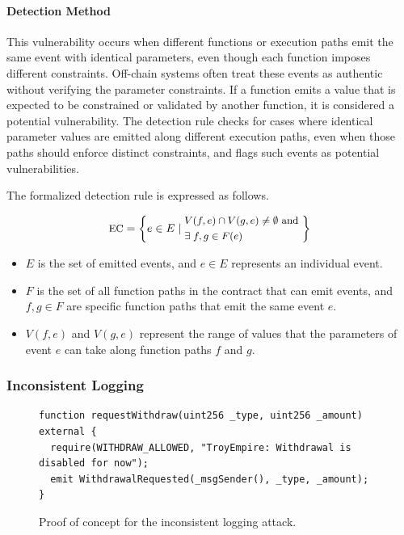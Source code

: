 \paragraph{Detection Method}
This vulnerability occurs when different functions or execution paths emit the same event with identical parameters, even though each function imposes different constraints. Off-chain systems often treat these events as authentic without verifying the parameter constraints. If a function emits a value that is expected to be constrained or validated by another function, it is considered a potential vulnerability. The detection rule checks for cases where identical parameter values are emitted along different execution paths, even when those paths should enforce distinct constraints, and flags such events as potential vulnerabilities.


The formalized detection rule is expressed as follows.

\begin{equation}
\small
\text{EC} = \left\{
e \in E \mid
\begin{aligned}
  & V(f, e) \cap V(g, e) \neq \emptyset \text{ and } \\
  & \exists \; f, g \in F(e)
\end{aligned}
\right\}
\end{equation}


\begin{itemize}
    \item \( E \) is the set of emitted events, and \( e \in E \) represents an individual event.
    \item \( F \) is the set of all function paths in the contract that can emit events, and \( f, g \in F \) are specific function paths that emit the same event \( e \).
    \item \( V(f, e) \) and \( V(g, e) \) represent the range of values that the parameters of event \( e \) can take along function paths \( f \) and \( g \).
\end{itemize}


\subsubsection{Inconsistent Logging}\label{vec:attack2}

\begin{figure}
\footnotesize
\small
\begin{lstlisting}[language=Solidity]
function requestWithdraw(uint256 _type, uint256 _amount) external {
  require(WITHDRAW_ALLOWED, "TroyEmpire: Withdrawal is disabled for now");
  emit WithdrawalRequested(_msgSender(), _type, _amount);
}
\end{lstlisting}
\caption{Proof of concept for the inconsistent logging attack.}\label{code:2}
\end{figure}

